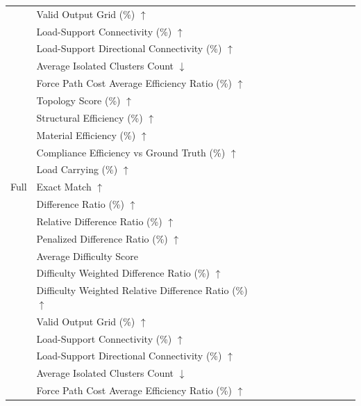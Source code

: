 \begin{table}[!h]
{\begin{tabular}{llllllllllll}
 & Valid Output Grid (\%) $\uparrow$ &  &  &  &  &  &  &  &  &  &  \\
 & Load-Support Connectivity (\%) $\uparrow$ &  &  &  &  &  &  &  &  &  &  \\
 & Load-Support Directional Connectivity (\%) $\uparrow$ &  &  &  &  &  &  &  &  &  &  \\
 & Average Isolated Clusters Count $\downarrow$ &  &  &  &  &  &  &  &  &  &  \\
 & Force Path Cost Average Efficiency Ratio (\%) $\uparrow$ &  &  &  &  &  &  &  &  &  &  \\
 & Topology Score (\%) $\uparrow$ &  &  &  &  &  &  &  &  &  &  \\
 & Structural Efficiency (\%) $\uparrow$ &  &  &  &  &  &  &  &  &  &  \\
 & Material Efficiency (\%) $\uparrow$ &  &  &  &  &  &  &  &  &  &  \\
 & Compliance Efficiency vs Ground Truth (\%) $\uparrow$ &  &  &  &  &  &  &  &  &  &  \\
 & Load Carrying (\%) $\uparrow$ &  &  &  &  &  &  &  &  &  &  \\
Full & Exact Match $\uparrow$ &  &  &  &  &  &  &  &  &  &  \\
 & Difference Ratio (\%) $\uparrow$ &  &  &  &  &  &  &  &  &  &  \\
 & Relative Difference Ratio (\%) $\uparrow$ &  &  &  &  &  &  &  &  &  &  \\
 & Penalized Difference Ratio (\%) $\uparrow$ &  &  &  &  &  &  &  &  &  &  \\
 & Average Difficulty Score &  &  &  &  &  &  &  &  &  &  \\
 & Difficulty Weighted Difference Ratio (\%) $\uparrow$ &  &  &  &  &  &  &  &  &  &  \\
 & Difficulty Weighted Relative Difference Ratio (\%) $\uparrow$ &  &  &  &  &  &  &  &  &  &  \\
 & Valid Output Grid (\%) $\uparrow$ &  &  &  &  &  &  &  &  &  &  \\
 & Load-Support Connectivity (\%) $\uparrow$ &  &  &  &  &  &  &  &  &  &  \\
 & Load-Support Directional Connectivity (\%) $\uparrow$ &  &  &  &  &  &  &  &  &  &  \\
 & Average Isolated Clusters Count $\downarrow$ &  &  &  &  &  &  &  &  &  &  \\
 & Force Path Cost Average Efficiency Ratio (\%) $\uparrow$ &  &  &  &  &  &  &  &  &  &  \\

\end{tabular}}
\end{table}
